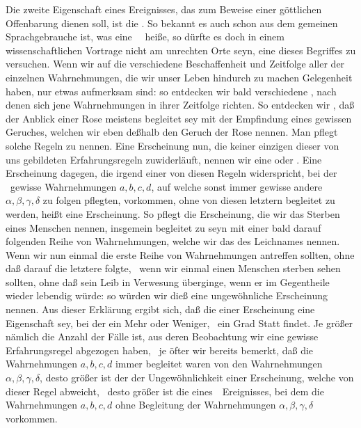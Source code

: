 \begin{aufza}
\item Die zweite Eigenschaft eines Ereignisses, das zum Beweise einer göttlichen Offenbarung dienen soll, ist die . So bekannt es auch schon aus dem gemeinen Sprachgebrauche ist, was eine ~\ heiße, so dürfte es doch in einem wissenschaftlichen Vortrage nicht am unrechten Orte seyn, eine  dieses Begriffes zu versuchen. Wenn wir auf die verschiedene Beschaffenheit und Zeitfolge aller der einzelnen Wahrnehmungen, die wir unser Leben hindurch zu machen Gelegenheit haben, nur etwas aufmerksam sind: so entdecken wir bald verschiedene , nach denen sich jene Wahrnehmungen in ihrer Zeitfolge richten. So entdecken wir \zB , daß der Anblick einer Rose meistens begleitet sey mit der Empfindung eines gewissen Geruches, welchen wir eben deßhalb den Geruch der Rose nennen. Man pflegt solche Regeln  zu nennen. Eine Erscheinung nun, die keiner einzigen dieser von uns gebildeten Erfahrungsregeln zuwiderläuft, nennen wir eine  oder . Eine Erscheinung dagegen, die irgend einer von diesen Regeln widerspricht, bei der \zB\ gewisse Wahrnehmungen \ensuremath{a, b, c, d}, auf welche sonst immer gewisse andere \ensuremath{\alpha, \beta, \gamma, \delta} 
zu folgen pflegten, vorkommen, ohne von diesen letztern begleitet zu werden, heißt eine  Erscheinung. So pflegt die Erscheinung, die wir das Sterben eines Menschen nennen, insgemein begleitet zu seyn mit einer bald darauf folgenden Reihe von Wahrnehmungen, welche wir das  des Leichnames nennen. Wenn wir nun einmal die erste Reihe von Wahrnehmungen antreffen sollten, ohne daß darauf die letztere folgte, \dh\ wenn wir einmal einen Menschen sterben sehen sollten, ohne daß sein Leib in Verwesung überginge, wenn er im Gegentheile wieder lebendig würde: so würden wir dieß eine ungewöhnliche Erscheinung nennen. Aus dieser Erklärung ergibt sich, daß die  einer Erscheinung eine Eigenschaft sey, bei der ein Mehr oder Weniger, \dh\ ein Grad Statt findet. Je größer nämlich die Anzahl der Fälle ist, aus deren Beobachtung wir eine gewisse Erfahrungsregel abgezogen haben, \dh\ je öfter wir bereits bemerkt, daß die Wahrnehmungen \ensuremath{a, b, c, d} immer begleitet waren von den Wahrnehmungen \ensuremath{\alpha, \beta, \gamma, \delta}, desto größer ist der  der Ungewöhnlichkeit einer Erscheinung, welche von dieser Regel abweicht, \dh\ desto größer ist die  eines~\ Ereignisses, bei dem die Wahrnehmungen \ensuremath{a, b, c, d} ohne Begleitung der Wahrnehmungen \ensuremath{\alpha, \beta, \gamma, \delta} vorkommen.
\end{aufza}

